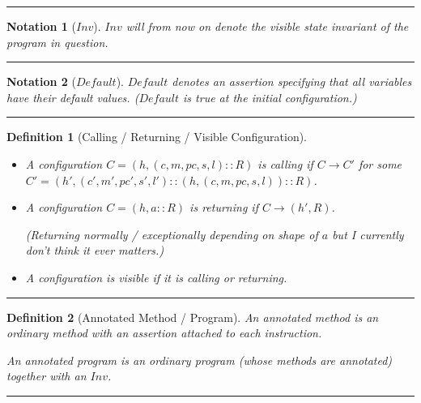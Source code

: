 \documentclass[a4paper,11pt]{article}
\newtheorem{definition}{Definition}
\newtheorem{notation}{Notation}
\newcommand{\Inv}{\mathit{Inv}}
\newcommand{\Default}{\mathit{Default}}
\newcommand{\pc}{\mathit{pc}}
\newcommand{\sep}{\hspace{-1.5707965cm}\rule{\paperwidth}{1pt}}
\begin{document}
\pagestyle{empty}

\sep

\begin{notation}[$\Inv$]
$\Inv$ will from now on denote the visible state invariant of the program in question.
\end{notation}


\sep


\begin{notation}[$\Default$]
$\Default$ denotes an assertion specifying that all variables have their default values. ($\Default$ is true at the initial configuration.)
\end{notation}


\sep


\begin{definition}[Calling / Returning / Visible Configuration]
~\\[-5mm]
\begin{itemize}
\item A configuration $C=(h, (c, m, \pc, s, l)::R)$ is \emph{calling} if $C \rightarrow C'$ for some $C' = (h', (c', m', \pc', s', l')::(h, (c, m, \pc, s, l))::R)$.
\item A configuration $C=(h, a::R)$ is \emph{returning} if $C \rightarrow (h', R)$.
  
  (Returning normally / exceptionally depending on shape of $a$ but I currently don't think it ever matters.)
  
\item A configuration is \emph{visible} if it is calling or returning.
\end{itemize}
\end{definition}


\sep


\begin{definition}[Annotated Method / Program]
An \emph{annotated method} is an ordinary method with an assertion attached to each instruction.

An \emph{annotated program} is an ordinary program (whose methods are annotated) together with an $\Inv$.
\end{definition}


\sep
\end{document}
